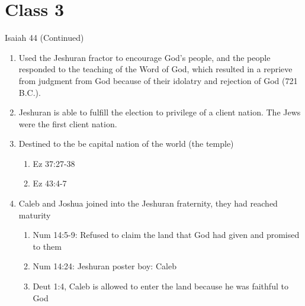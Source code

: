 \documentclass[11pt]{article}
\begin{document}
\section{Class 3}
Isaiah 44 (Continued)
\begin{enumerate}
	\item Used the Jeshuran fractor to encourage God's people, and the people responded to the teaching of the Word of God, which resulted in a reprieve from judgment from God because of their idolatry and rejection of God (721 B.C.).
	\item Jeshuran is able to fulfill the election to privilege of a client nation. The Jews were the first client nation.
	\item Destined to the be capital nation of the world (the temple)
	\begin{enumerate}
		\item Ez 37:27-38
		\item Ez 43:4-7
	\end{enumerate} 
	\item Caleb and Joshua joined into the Jeshuran fraternity, they had reached maturity
	\begin{enumerate}
		\item Num 14:5-9: Refused to claim the land that God had given and promised to them
		\item Num 14:24: Jeshuran poster boy: Caleb
		\item Deut 1:4, Caleb is allowed to enter the land because he was faithful to God
	

\end{enumerate}
\end{enumerate}
\end{document}
